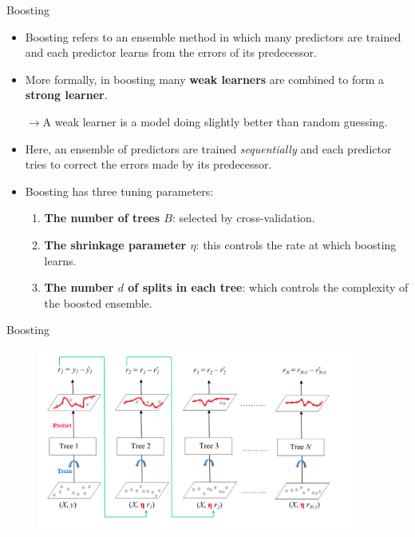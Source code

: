 \begin{frame}{Boosting}

\begin{itemize}
    \item Boosting refers to an ensemble method in which many predictors are trained and each predictor learns from the errors of its predecessor. \pause 

    \item  More formally, in boosting many \textbf{weak learners} are combined to form a \textbf{strong learner}. \pause

    $\rightarrow$A weak learner is a model doing slightly better than random guessing.  \pause 

    \item Here, an ensemble of predictors are trained \textit{sequentially} and each predictor tries to correct the errors made by its predecessor. \pause 
    \item Boosting has three tuning parameters:

    \begin{enumerate}
        \item \textbf{The number of trees $B$}: selected by cross-validation. \pause 

        \item \textbf{The shrinkage parameter $\eta$}: this controls the rate at which boosting learns. \pause 

        \item \textbf{The number $d$ of splits in each tree}: which controls the complexity of the boosted ensemble.
    \end{enumerate}

    
\end{itemize}
    
\end{frame}

\begin{frame}{Boosting}
\begin{figure}
    \centering
    \includegraphics[height=6cm]{bagging-boosting/boosting.png}
\end{figure}
    
\end{frame}
